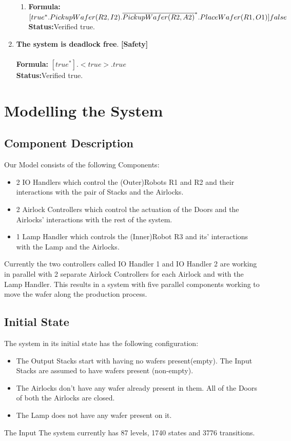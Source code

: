 \documentclass[a4paper,12pt]{article}
\begin{document}
\begin{enumerate}
\begin{enumerate}
\item \textbf{Formula:} $[true^* . PickupWafer(R2, I2) .\overline{PickupWafer(R2, A2)}^* . 
\\PlaceWafer(R1, O1)] false $
\\\textbf{Status:}Verified true.

\end{enumerate}
\item \textbf{The system is deadlock free}. \textbf{[Safety]}
\\
\\\textbf{Formula:} $[true^*]. <true> . true$
\\\textbf{Status:}Verified true.
\end{enumerate}

\newpage
\section{Modelling the System}
\subsection{Component Description}
Our Model consists of the following Components:
\begin{itemize}
    \item 2 IO Handlers which control the (Outer)Robots R1 and R2 and their interactions with the pair of Stacks and the Airlocks.
    \item 2 Airlock Controllers which control the actuation of the Doors and the Airlocks' interactions with the rest of the system.
    \item 1 Lamp Handler which controls the (Inner)Robot R3 and its' interactions with the Lamp and the Airlocks.
\end{itemize}
Currently the two controllers called IO Handler 1 and IO Handler 2 are working in parallel with 2 separate Airlock Controllers for each Airlock and with the Lamp Handler. This results in a system with five parallel components working to move the wafer along the production process. 
\subsection{Initial State}
The system in its initial state has the following configuration:
\begin{itemize}
    \item The Output Stacks start with having no wafers present(empty). The Input Stacks are assumed to have wafers present (non-empty).
    \item The Airlocks don't have any wafer already present in them. All of the Doors of both the Airlocks are closed.
    \item The Lamp does not have any wafer present on it.
\end{itemize} 
The Input The system currently has 87 levels, 1740 states and 3776 transitions.
\end{document}
